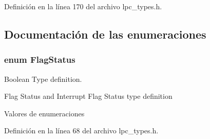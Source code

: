Definición en la línea 170 del archivo lpc\+\_\+types.\+h.



\subsection{Documentación de las enumeraciones}
\subsubsection[{\texorpdfstring{Flag\+Status}{FlagStatus}}]{\setlength{\rightskip}{0pt plus 5cm}enum {\bf Flag\+Status}}\hypertarget{group___l_p_c___types___public___types_ga89136caac2e14c55151f527ac02daaff}{}\label{group___l_p_c___types___public___types_ga89136caac2e14c55151f527ac02daaff}


Boolean Type definition. 

Flag Status and Interrupt Flag Status type definition \begin{Desc}
\item[Valores de enumeraciones]\par
\begin{description}
\item[{\em 
R\+E\+S\+ET\hypertarget{group___l_p_c___types___public___types_gga89136caac2e14c55151f527ac02daaffa589b7d94a3d91d145720e2fed0eb3a05}{}\label{group___l_p_c___types___public___types_gga89136caac2e14c55151f527ac02daaffa589b7d94a3d91d145720e2fed0eb3a05}
}]\item[{\em 
S\+ET\hypertarget{group___l_p_c___types___public___types_gga89136caac2e14c55151f527ac02daaffab44c8101cc294c074709ec1b14211792}{}\label{group___l_p_c___types___public___types_gga89136caac2e14c55151f527ac02daaffab44c8101cc294c074709ec1b14211792}
}]\end{description}
\end{Desc}


Definición en la línea 68 del archivo lpc\+\_\+types.\+h.


